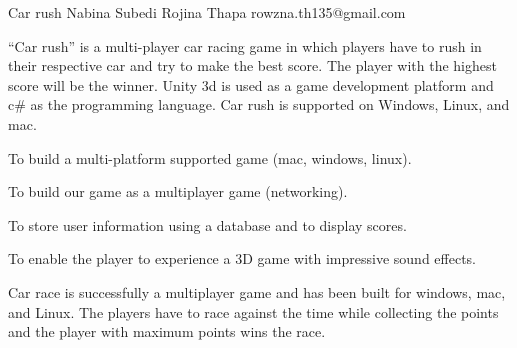  \begin{conf-abstract}[]
 {Car rush}
 {Nabina Subedi Rojina Thapa
 }
{rowzna.th135@gmail.com}

“Car rush” is a multi-player car racing game in which players have to rush in their respective car and try to make the best score. The player with the highest score will be the winner. Unity 3d is used as a game development platform and c\# as the programming language. Car rush is supported on Windows, Linux, and mac. 

To build a multi-platform supported game (mac, windows, linux).

To build our game as a multiplayer game (networking).

To store user information using a database and to display scores.

To enable the player to experience a 3D game with impressive sound effects.

Car race is successfully a multiplayer game and has been built for windows, mac, and Linux. The players have to race against the time while collecting the points and the player with maximum points wins the race. 
 \end{conf-abstract}

